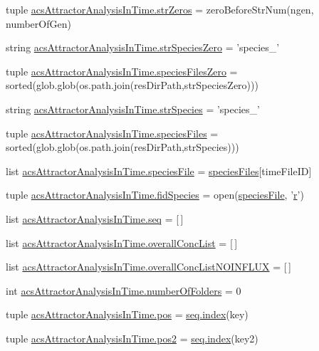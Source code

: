 \begin{DoxyCompactItemize}
\item 
tuple \hyperlink{a00125_a9401cc8fb642e77e034e21ef9babcb24}{acs\+Attractor\+Analysis\+In\+Time.\+str\+Zeros} = zero\+Before\+Str\+Num(ngen, number\+Of\+Gen)
\item 
string \hyperlink{a00125_aea2d717887265b294c623099d2495d4f}{acs\+Attractor\+Analysis\+In\+Time.\+str\+Species\+Zero} = 'species\+\_\+'
\item 
tuple \hyperlink{a00125_a4657fd3a80cf1c76ab075d62d8de3bf3}{acs\+Attractor\+Analysis\+In\+Time.\+species\+Files\+Zero} = sorted(glob.\+glob(os.\+path.\+join(res\+Dir\+Path,str\+Species\+Zero)))
\item 
string \hyperlink{a00125_ac1f05e7db61bcc83ea1ed27460462202}{acs\+Attractor\+Analysis\+In\+Time.\+str\+Species} = 'species\+\_\+'
\item 
tuple \hyperlink{a00125_a18645475f8596346ca431e99661b5674}{acs\+Attractor\+Analysis\+In\+Time.\+species\+Files} = sorted(glob.\+glob(os.\+path.\+join(res\+Dir\+Path,str\+Species)))
\item 
list \hyperlink{a00125_a3c620554bbf7ae30d97a60565fea8d1e}{acs\+Attractor\+Analysis\+In\+Time.\+species\+File} = \hyperlink{a00028_af5703745c2c2a6af7f62da460994d9c2}{species\+Files}\mbox{[}time\+File\+I\+D\mbox{]}
\item 
tuple \hyperlink{a00125_a70d70b9ab98e722475b03465c7f8dbbe}{acs\+Attractor\+Analysis\+In\+Time.\+fid\+Species} = open(\hyperlink{a00027_a7da0c82834970c5f3c3d9224ab832577}{species\+File}, '\hyperlink{a00031_ac862e7284527eb913b1351c8bfb8e079}{r}')
\item 
list \hyperlink{a00125_a1bdf98839177836f238806755e46ac3c}{acs\+Attractor\+Analysis\+In\+Time.\+seq} = \mbox{[}$\,$\mbox{]}
\item 
list \hyperlink{a00125_a2cebadd75179c46e551a2facbdd2741b}{acs\+Attractor\+Analysis\+In\+Time.\+overall\+Conc\+List} = \mbox{[}$\,$\mbox{]}
\item 
list \hyperlink{a00125_ad7eab833592c6cd395f9e2416dd13920}{acs\+Attractor\+Analysis\+In\+Time.\+overall\+Conc\+List\+N\+O\+I\+N\+F\+L\+U\+X} = \mbox{[}$\,$\mbox{]}
\item 
int \hyperlink{a00125_a3a2fe097086bb0f4a505fca8f53dc2b0}{acs\+Attractor\+Analysis\+In\+Time.\+number\+Of\+Folders} = 0
\item 
tuple \hyperlink{a00125_aa39692272363cd6f687c4b2a53f96594}{acs\+Attractor\+Analysis\+In\+Time.\+pos} = \hyperlink{a00102_a0cd6a44ffb07342cbc7e5ac33bfc9495}{seq.\+index}(key)
\item 
tuple \hyperlink{a00125_a49fec7e1deea4728b5ef4a487d155de9}{acs\+Attractor\+Analysis\+In\+Time.\+pos2} = \hyperlink{a00102_a0cd6a44ffb07342cbc7e5ac33bfc9495}{seq.\+index}(key2)

\end{DoxyCompactItemize}
